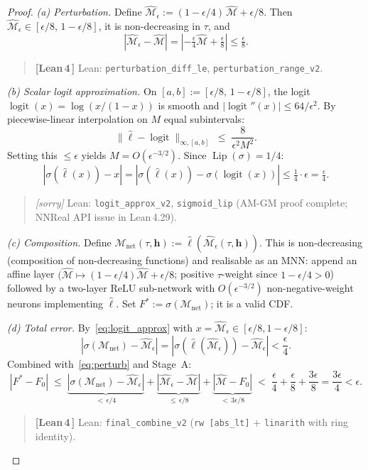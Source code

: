 \documentclass[11pt]{article}
\theoremstyle{remark}
\newcommand{\verified}{%
  \textcolor{green!60!black}{\textbf{[Lean\,4\,\checkmark]}}}
\newcommand{\sorrymark}{%
  \textcolor{orange!60!black}{\textit{[sorry]}}}
\newcommand{\cM}{\mathcal{M}}
\newcommand{\hhat}{\boldsymbol{h}}
\newcommand{\sigmoid}{\sigma}
\begin{document}
\begin{proof}
\emph{(a) Perturbation.}
Define $\hat{\cM}_\epsilon := (1 - \epsilon/4)\,\hat{\cM} + \epsilon/8$.
Then $\hat{\cM}_\epsilon \in [\epsilon/8,\, 1 - \epsilon/8]$, it is
non-decreasing in $\tau$, and
\begin{equation}
  |\hat{\cM}_\epsilon - \hat{\cM}|
  = |{-\tfrac{\epsilon}{4}}\hat{\cM} + \tfrac{\epsilon}{8}|
  \le \tfrac{\epsilon}{8}.
  \label{eq:perturb}
\end{equation}
\begin{quote}\small\verified{} Lean: \texttt{perturbation\_diff\_le},
\texttt{perturbation\_range\_v2}.\end{quote}

\emph{(b) Scalar logit approximation.}
On $[a,b] := [\epsilon/8,\,1-\epsilon/8]$, the logit
$\operatorname{logit}(x) = \log(x/(1-x))$
is smooth and $|\operatorname{logit}''(x)| \le 64/\epsilon^2$.
By piecewise-linear interpolation on $M$ equal subintervals:
\[
  \|\hat{\ell} - \operatorname{logit}\|_{\infty,[a,b]}
  \;\le\; \frac{8}{\epsilon^2 M^2}.
\]
Setting this $\le \epsilon$ yields $M = O(\epsilon^{-3/2})$.
Since $\operatorname{Lip}(\sigmoid) = 1/4$:
\begin{equation}
  |\sigmoid(\hat{\ell}(x)) - x|
  = |\sigmoid(\hat{\ell}(x)) - \sigmoid(\operatorname{logit}(x))|
  \le \tfrac{1}{4}\cdot\epsilon
  = \tfrac{\epsilon}{4}.
  \label{eq:logit_approx}
\end{equation}
\begin{quote}\small\sorrymark{} Lean: \texttt{logit\_approx\_v2},
\texttt{sigmoid\_lip} (AM-GM proof complete; NNReal API issue in Lean\,4.29).\end{quote}

\emph{(c) Composition.}
Define
$\cM_{\mathrm{net}}(\tau,\hhat) := \hat{\ell}(\hat{\cM}_\epsilon(\tau,\hhat))$.
This is non-decreasing (composition of non-decreasing functions) and
realisable as an MNN: append an affine layer
$(\hat{\cM} \mapsto (1-\epsilon/4)\hat{\cM} + \epsilon/8$;
positive $\tau$-weight since $1-\epsilon/4 > 0$)
followed by a two-layer ReLU sub-network with $O(\epsilon^{-3/2})$
non-negative-weight neurons implementing $\hat{\ell}$.
Set $F^* := \sigmoid(\cM_{\mathrm{net}})$; it is a valid CDF.

\emph{(d) Total error.}
By~\eqref{eq:logit_approx} with $x = \hat{\cM}_\epsilon \in [\epsilon/8,1-\epsilon/8]$:
\[
  |\sigmoid(\cM_{\mathrm{net}}) - \hat{\cM}_\epsilon|
  = |\sigmoid(\hat{\ell}(\hat{\cM}_\epsilon)) - \hat{\cM}_\epsilon|
  < \frac{\epsilon}{4}.
\]
Combined with~\eqref{eq:perturb} and Stage~A:
\begin{equation}
  |F^* - F_0|
  \;\le\;
  \underbrace{|\sigmoid(\cM_{\mathrm{net}}) - \hat{\cM}_\epsilon|}_{<\,\epsilon/4}
  +
  \underbrace{|\hat{\cM}_\epsilon - \hat{\cM}|}_{\le\,\epsilon/8}
  +
  \underbrace{|\hat{\cM} - F_0|}_{<\,3\epsilon/8}
  \;<\;
  \frac{\epsilon}{4} + \frac{\epsilon}{8} + \frac{3\epsilon}{8}
  = \frac{3\epsilon}{4} < \epsilon.
  \label{eq:total}
\end{equation}
\begin{quote}\small\verified{} Lean: \texttt{final\_combine\_v2}
(\texttt{rw [abs\_lt]} $+$ \texttt{linarith} with ring identity).\end{quote}


\end{proof}
\end{document}
